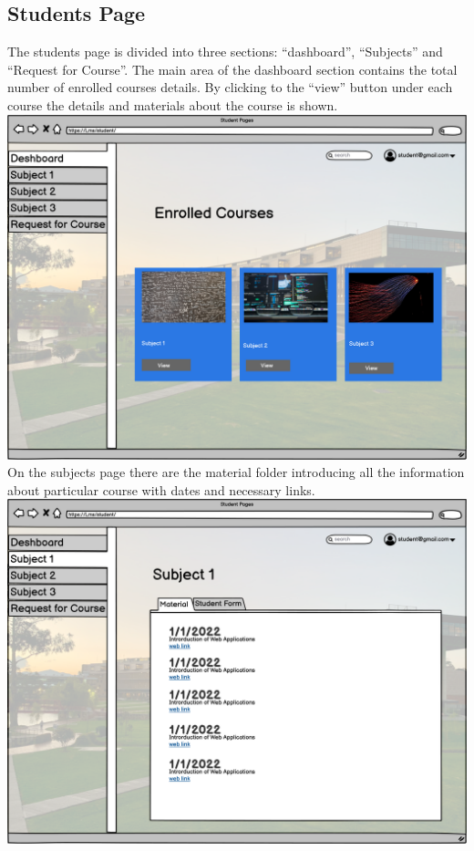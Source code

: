 \newpage
\subsection{Students Page}
The students page is divided into three sections: “dashboard”, “Subjects” and “Request for Course”. The main area of the dashboard section contains the total number of enrolled courses details. By clicking to the “view” button under each course the details and materials about the course is shown.\\

\includegraphics[width=\columnwidth]{images/Student Form.png}
\newpage
On the subjects page there are the material folder introducing all the information about particular course with dates and necessary links.\\

\includegraphics[width=\columnwidth]{images/Subject 1 student.png}\\

